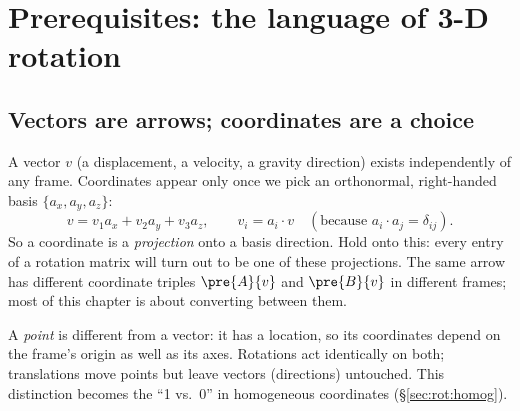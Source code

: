 \section{Prerequisites: the language of 3-D rotation}\label{sec:rot:prerequisites}

\subsection{Vectors are arrows; coordinates are a choice}\label{sec:rot:vectors-are-arrows}
A vector $v$ (a displacement, a velocity, a gravity direction) exists independently of any frame. Coordinates appear only once we pick an orthonormal, right-handed basis $\{a_x,a_y,a_z\}$:
\[
v = v_1 a_x + v_2 a_y + v_3 a_z,\qquad v_i = a_i\cdot v \quad(\text{because } a_i\cdot a_j=\delta_{ij}).
\]
So a coordinate is a \emph{projection} onto a basis direction. Hold onto this: every entry of a rotation matrix will turn out to be one of these projections. The same arrow has different coordinate triples $\pre{A}{v}$ and $\pre{B}{v}$ in different frames; most of this chapter is about converting between them.

A \emph{point} is different from a vector: it has a location, so its coordinates depend on the frame's origin as well as its axes. Rotations act identically on both; translations move points but leave vectors (directions) untouched. This distinction becomes the ``1 vs.\ 0'' in homogeneous coordinates (\S\ref{sec:rot:homog}).


